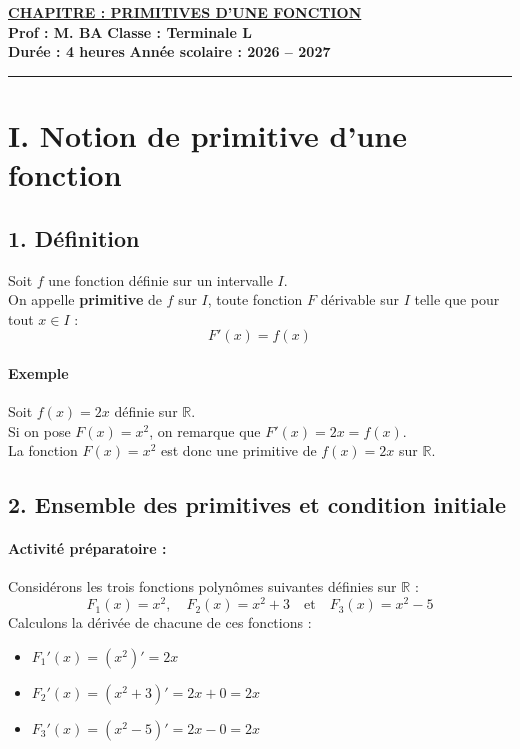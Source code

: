 \documentclass[12pt,a4paper]{article}
\begin{document}
\begin{center}
    \Large\textbf{\underline{\textcolor{myred}{CHAPITRE : PRIMITIVES D'UNE FONCTION}}}\\[0.2cm]
    \normalsize\textbf{Prof : M. BA} \hfill \textbf{Classe : Terminale L}\\[0.1cm]
    \textbf{Durée : 4 heures} \hfill \textbf{Année scolaire : 2026 -- 2027}
\end{center}
\hrule
\vspace{0.3cm}


\section*{\color{myred}I. Notion de primitive d'une fonction}

\subsection*{\color{myred}1. Définition}

\begin{tcolorbox}[colback=blue!5!white,colframe=myblue,title=\textbf{Définition}]
Soit $f$ une fonction définie sur un intervalle $I$.\\
On appelle \textbf{primitive} de $f$ sur $I$, toute fonction $F$ dérivable sur $I$ telle que pour tout $x \in I$ :
\[
F'(x) = f(x)
\]
\end{tcolorbox}

\paragraph{Exemple}
Soit $f(x) = 2x$ définie sur $\mathbb{R}$.\\
Si on pose $F(x) = x^2$, on remarque que $F'(x) = 2x = f(x)$.\\
La fonction $F(x) = x^2$ est donc une primitive de $f(x) = 2x$ sur $\mathbb{R}$.

\subsection*{\color{myred}2. Ensemble des primitives et condition initiale}

\paragraph{Activité préparatoire :}
Considérons les trois fonctions polynômes suivantes définies sur $\mathbb{R}$ :
\[
F_1(x) = x^2, \quad F_2(x) = x^2 + 3 \quad \text{et} \quad F_3(x) = x^2 - 5
\]
Calculons la dérivée de chacune de ces fonctions :
\begin{itemize}
    \item $F_1'(x) = (x^2)' = 2x$
    \item $F_2'(x) = (x^2 + 3)' = 2x + 0 = 2x$
    \item $F_3'(x) = (x^2 - 5)' = 2x - 0 = 2x$
\end{itemize}
\end{document}
